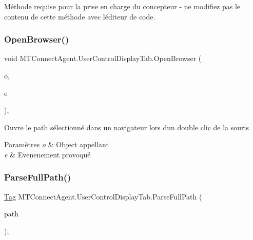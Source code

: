 Méthode requise pour la prise en charge du concepteur -\/ ne modifiez pas le contenu de cette méthode avec l\textquotesingle{}éditeur de code. 

\mbox{\label{class_m_t_connect_agent_1_1_user_control_display_tab_a35c3095a47ee602da98eca8e77e6ff3b}} 
\subsubsection{\texorpdfstring{Open\+Browser()}{OpenBrowser()}}
{\footnotesize\ttfamily void M\+T\+Connect\+Agent.\+User\+Control\+Display\+Tab.\+Open\+Browser (\begin{DoxyParamCaption}\item[{object}]{o,  }\item[{Mouse\+Event\+Args}]{e }\end{DoxyParamCaption})\hspace{0.3cm}{\ttfamily [inline]}, {\ttfamily [private]}}



Ouvre le path sélectionné dans un navigateur lors d\textquotesingle{}un double clic de la souris 


\begin{DoxyParams}{Paramètres}
{\em o} & Object appellant\\
\hline
{\em e} & Evenenement provoqué\\
\hline
\end{DoxyParams}
\mbox{\label{class_m_t_connect_agent_1_1_user_control_display_tab_adee83739d03527dcd7dd13c95d8ca3c9}} 
\subsubsection{\texorpdfstring{Parse\+Full\+Path()}{ParseFullPath()}}
{\footnotesize\ttfamily \mbox{\hyperlink{class_m_t_connect_agent_1_1_model_1_1_tag}{Tag}} M\+T\+Connect\+Agent.\+User\+Control\+Display\+Tab.\+Parse\+Full\+Path (\begin{DoxyParamCaption}\item[{string}]{path }\end{DoxyParamCaption})\hspace{0.3cm}{\ttfamily [inline]}, {\ttfamily [private]}}



